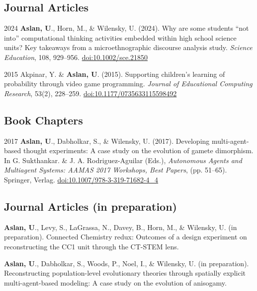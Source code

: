 \documentclass[11pt,letterpaper]{report} %
\begin{document}
    \subsection*{Journal Articles}

    \begin{tablist}

        \item[2024] \tab{}\textbf{Aslan, U}., Horn, M., \& Wilensky, U. (2024). Why are some students \enquote{not into} computational thinking activities embedded within high school science units? Key takeaways from a microethnographic discourse analysis study. \textit{Science Education}, 108, 929--956. \href{https://doi.org/10.1002/sce.21850}{doi:10.1002/sce.21850}

        \item[2015] \tab{}Akpinar, Y. \& \textbf{Aslan, U}. (2015). Supporting children's learning of probability through video game programming. \textit{Journal of Educational Computing Research}, 53(2), 228--259. \href{https://doi.org/10.1177/0735633115598492}{doi:10.1177/0735633115598492}

    \end{tablist}



    \subsection*{Book Chapters}

    \begin{tablist}

        \item[2017] \tab{}\textbf{Aslan, U}., Dabholkar, S., \& Wilensky, U. (2017). Developing multi-agent-based thought experiments: A case study on the evolution of gamete dimorphism. In G. Sukthankar. \& J. A. Rodriguez-Aguilar (Eds.), \textit{Autonomous Agents and Multiagent Systems: AAMAS 2017 Workshops, Best Papers}, (pp. 51--65). Springer, Verlag. \href{https://doi.org/10.1007/978-3-319-71682-4\_4}{doi:10.1007/978-3-319-71682-4\_4}

    \end{tablist}

    \subsection*{Journal Articles (in preparation)}

    \begin{tablist}

        \item[] \tab{}\textbf{Aslan, U}., Levy, S., LaGrassa, N., Davey, B., Horn, M., \& Wilensky, U. (in preparation). Connected Chemistry redux: Outcomes of a design experiment on reconstructing the CC1 unit through the CT-STEM lens.

        \item[] \tab{}\textbf{Aslan, U}., Dabholkar, S., Woods, P., Noel, I., \& Wilensky, U. (in preparation). Reconstructing population-level evolutionary theories through spatially explicit multi-agent-based modeling: A case study on the evolution of anisogamy.

    \end{tablist}
\end{document}
